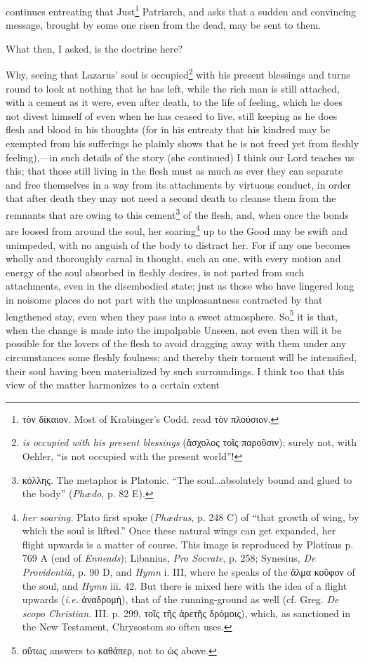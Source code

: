 continues entreating that Just\footnote{\textgreek{τὸν δίκαιον}. Most of Krabinger’s Codd. read \textgreek{τὸν πλούσιον}.} Patriarch, and asks that a sudden and convincing message, brought by some one risen from the dead, may be sent to them.

What then, I asked, is the doctrine here?

Why, seeing that Lazarus’ soul is occupied\footnote{\emph{is occupied with his present blessings} (\textgreek{ἄσχολος τοῖς παροῦσιν}); surely not, with Oehler, “is not occupied with the present world”!} with his present blessings and turns round to look at nothing that he has left, while the rich man is still attached, with a cement as it were, even after death, to the life of feeling, which he does not divest himself of even when he has ceased to live, still keeping as he does flesh and blood in his thoughts (for in his entreaty that his kindred may be exempted from his sufferings he plainly shows that he is not freed yet from fleshly feeling),—in such details of the story (she continued) I think our Lord teaches us this; that those still living in the flesh must as much as ever they can separate and free themselves in a way from its attachments by virtuous conduct, in order that after death they may not need a second death to cleanse them from the remnants that are owing to this cement\footnote{\textgreek{κόλλης}. The metaphor is Platonic. “The soul…absolutely bound and glued to the body” (\emph{Phædo}, p. 82 E).} of the flesh, and, when once the bonds are loosed from around the soul, her soaring\footnote{\emph{her soaring.} Plato first spoke (\emph{Phædrus}, p. 248 C) of “that growth of wing, by which the soul is lifted.” Once these natural wings can get expanded, her flight upwards is a matter of course. This image is reproduced by Plotinus p. 769 A (end of \emph{Enneads}); Libanius, \emph{Pro Socrate}, p. 258; Synesius, \emph{De Providentiâ,} p. 90 D, and \emph{Hymn} i. III, where he speaks of the \textgreek{ἅλμα κοῦφον} of the soul, and \emph{Hymn} iii. 42. But there is mixed here with the idea of a flight upwards (\emph{i.e.} \textgreek{ἀναδρομὴ}), that of the running-ground as well (cf. Greg. \emph{De scopo Christian.} III. p. 299, \textgreek{τοῖς τῆς ἀρετῆς δρόμοις}), which, as sanctioned in the New Testament, Chrysostom so often uses.} up to the Good may be swift and unimpeded, with no anguish of the body to distract her. For if any one becomes wholly and thoroughly carnal in thought, such an one, with every motion and energy of the soul absorbed in fleshly desires, is not parted from such attachments, even in the disembodied state; just as those who have lingered long in noisome places do not part with the unpleasantness contracted by that lengthened stay, even when they pass into a sweet atmosphere. So\footnote{\textgreek{οὕτως} answers to \textgreek{καθάπερ}, not to ὡς above.} it is that, when the change is made into the impalpable Unseen, not even then will it be possible for the lovers of the flesh to avoid dragging away with them under any circumstances some fleshly foulness; and thereby their torment will be intensified, their soul having been materialized by such surroundings. I think too that this view of the matter harmonizes to a certain extent 